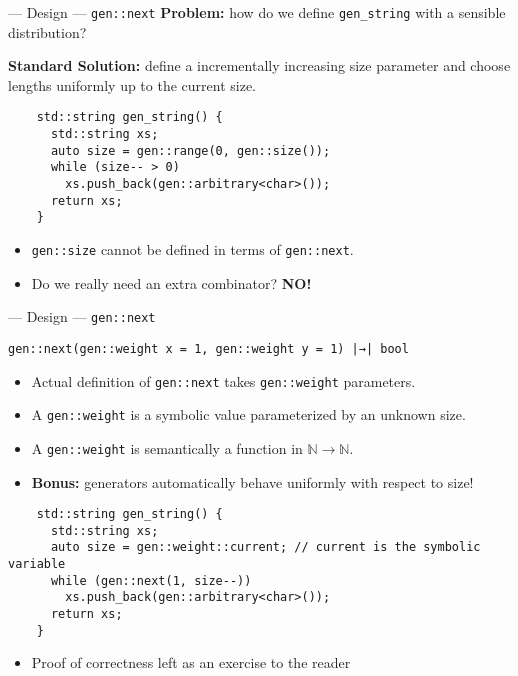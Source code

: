 \begin{frame}[fragile,t]{\halcheck{} --- Design --- \texttt{gen::next}}
  \textbf{Problem:} how do we define \texttt{gen_string} with a sensible distribution?

  \pause{}

  \textbf{Standard Solution:} define a incrementally increasing size parameter and choose lengths uniformly up to the current size.

  \begin{verbatim}
    std::string gen_string() {
      std::string xs;
      auto size = gen::range(0, gen::size());
      while (size-- > 0)
        xs.push_back(gen::arbitrary<char>());
      return xs;
    }
  \end{verbatim}

  \pause{}

  \begin{itemize}
    \item \texttt{gen::size} cannot be defined in terms of \texttt{gen::next}.
    \item Do we really need an extra combinator? \pause\textbf{NO!}
  \end{itemize}
\end{frame}

\begin{frame}[fragile,t]{\halcheck{} --- Design --- \texttt{gen::next}}
  \begin{center}
    \texttt{gen::next(gen::weight x = 1, gen::weight y = 1) |→| bool}
  \end{center}

  \begin{itemize}
    \item Actual definition of \texttt{gen::next} takes \texttt{gen::weight} parameters.
    \item A \texttt{gen::weight} is a symbolic value parameterized by an unknown size.
    \item A \texttt{gen::weight} is semantically a function in $\mathbb{N} \to \mathbb{N}$.
    \item \textbf{Bonus:} generators automatically behave uniformly with respect to size!
  \end{itemize}

  \begin{verbatim}
    std::string gen_string() {
      std::string xs;
      auto size = gen::weight::current; // current is the symbolic variable
      while (gen::next(1, size--))
        xs.push_back(gen::arbitrary<char>());
      return xs;
    }
  \end{verbatim}

  \begin{itemize}
    \item Proof of correctness left as an exercise to the reader \smiley{}
  \end{itemize}
\end{frame}

